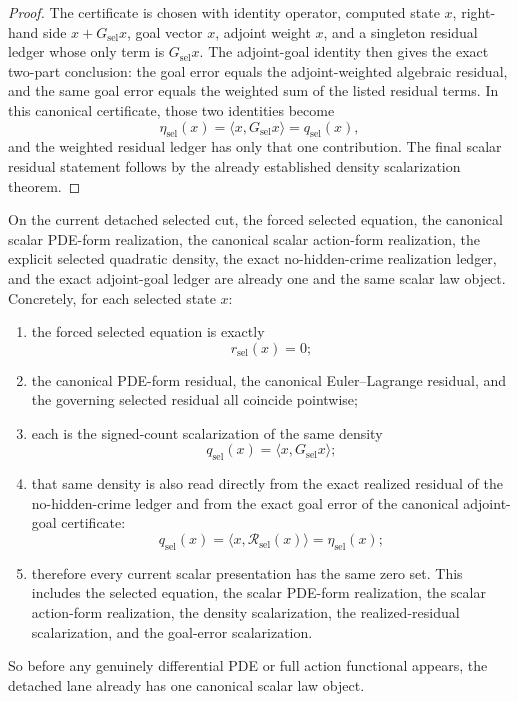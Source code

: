 \begin{proof}
The certificate is chosen with identity operator, computed state \(x\),
right-hand side \(x+G_{\mathrm{sel}}x\), goal vector \(x\), adjoint weight
\(x\), and a singleton residual ledger whose only term is
\(G_{\mathrm{sel}}x\). The adjoint-goal identity then gives the exact two-part
conclusion: the goal error equals the adjoint-weighted algebraic residual, and
the same goal error equals the weighted sum of the listed residual terms. In
this canonical certificate, those two identities become
\[
\eta_{\mathrm{sel}}(x)
  =\langle x,G_{\mathrm{sel}}x\rangle
  =q_{\mathrm{sel}}(x),
\]
and the weighted residual ledger has only that one contribution. The final
scalar residual statement follows by the already established density
scalarization theorem.
\end{proof}

\begin{theorem}
\label{thm:the-selected-cut-already-carries-one-canonical-scalar-law-object}
On the current detached selected cut, the forced selected equation, the
canonical scalar PDE-form realization, the canonical scalar action-form
realization, the explicit selected quadratic density, the exact no-hidden-crime
realization ledger, and the exact adjoint-goal ledger are already one and the
same scalar law object. Concretely, for each selected state \(x\):
\begin{enumerate}
\item the forced selected equation is exactly
\[
r_{\mathrm{sel}}(x)=0;
\]
\item the canonical PDE-form residual, the canonical Euler--Lagrange residual,
      and the governing selected residual all coincide pointwise;
\item each is the signed-count scalarization of the same density
\[
q_{\mathrm{sel}}(x)=\langle x,G_{\mathrm{sel}}x\rangle;
\]
\item that same density is also read directly from the exact realized residual
      of the no-hidden-crime ledger and from the exact goal error of the
      canonical adjoint-goal certificate:
\[
q_{\mathrm{sel}}(x)=\langle x,\mathcal R_{\mathrm{sel}}(x)\rangle
  =\eta_{\mathrm{sel}}(x);
\]
\item therefore every current scalar presentation has the same zero set. This
      includes the selected equation, the scalar PDE-form realization, the
      scalar action-form realization, the density scalarization, the
      realized-residual scalarization, and the goal-error scalarization.
\end{enumerate}
So before any genuinely differential PDE or full action functional appears,
the detached lane already has one canonical scalar law object.
\end{theorem}


